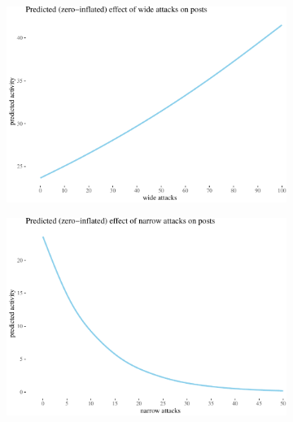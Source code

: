 \documentclass[10pt,]{scrartcl}
\begin{document}
\begin{figure}
\begin{subfigure}[b]{0.45\textwidth}

\begin{center}\includegraphics[width=1\linewidth]{redditAnalysisWalkthrough_files/figure-latex/unnamed-chunk-106-1} \end{center}
\end{subfigure}
\hfill
\begin{subfigure}[b]{0.45\textwidth}

\begin{center}\includegraphics[width=1\linewidth]{redditAnalysisWalkthrough_files/figure-latex/unnamed-chunk-107-1} \end{center}
\end{subfigure}

\centering
\begin{subfigure}[t]{0.45\textwidth}


\end{subfigure}
\end{figure}
\end{document}
